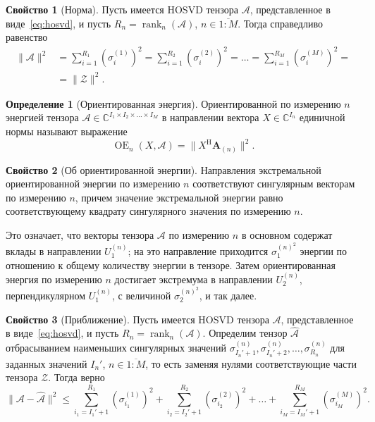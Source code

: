 \documentclass[specialist,
    substylefile = spbu_report.rtx,
    subf,href,colorlinks=true, 12pt]{disser}
\theoremstyle{plain}
\theoremstyle{definition}
\newtheorem{definition}{Определение}[section]
\newtheorem{property}{Свойство}[section]
\theoremstyle{remark}
\begin{document}
    \begin{property}[Норма]
        \label{property:norm}
        Пусть имеется HOSVD тензора $\mathcal{A}$, представленное в виде~\eqref{eq:hosvd}, и пусть $R_n=\operatorname{rank}_n(\mathcal{A})$,
        $n\in \overline{1:M}$.
        Тогда справедливо равенство
        \begin{align*}
            \|\mathcal{A}\|^2&=\sum_{i=1}^{R_1}\left( \sigma_i^{(1)} \right)^2=\sum_{i=1}^{R_2}\left( \sigma_i^{(2)} \right)^2
            =\ldots =\sum_{i=1}^{R_M}\left( \sigma_i^{(M)} \right)^2=\\
            &= \|\mathcal{Z}\|^2.
        \end{align*}
    \end{property}

    \begin{definition}[Ориентированная энергия]
        Ориентированной по измерению $n$ энергией тензора $\mathcal{A}\in \mathbb{C}^{I_1\times I_2\times \ldots \times I_M}$ в направлении
        вектора $X\in \mathbb{C}^{I_n}$ единичной нормы называют выражение
        \[
            \operatorname{OE}_n(X, \mathcal{A}) = \|X^{\mathrm{H}}\mathbf{A}_{(n)}\|^2.
        \]
    \end{definition}

    \begin{property}[Об ориентированной энергии]
        \label{property:oriented-energy}
        Направления экстремальной ориентированной энергии по измерению $n$ соответствуют сингулярным векторам по измерению $n$,
        причем значение экстремальной энергии равно соответствующему квадрату сингулярного значения по измерению $n$.
    \end{property}

    Это означает, что векторы тензора $\mathcal{A}$ по измерению $n$ в основном содержат вклады в направлении $U^{(n)}_1$;
    на это направление приходится $\sigma^{(n)^2}_1$ энергии по отношению к общему количеству энергии в тензоре.
    Затем ориентированная энергия по измерению $n$ достигает экстремума в направлении $U^{(n)}_2$,
    перпендикулярном $U^{(n)}_1$, с величиной $\sigma^{(n)^2}_2$, и так далее.

    \begin{property}[Приближение]
        \label{property:approx}
        Пусть имеется HOSVD тензора $\mathcal{A}$, представленное в виде~\eqref{eq:hosvd}, и пусть $R_n=\operatorname{rank}_n(\mathcal{A})$.
        Определим тензор $\hat{\mathcal{A}}$ отбрасыванием наименьших сингулярных значений $\sigma_{I_{n}'+1}^{(n)}, \sigma_{I_{n}'+2}^{(n)},\ldots, \sigma_{R_n}^{(n)}$
        для заданных значений $I_{n}'$, $n \in \overline{1:M}$, то есть заменяя нулями соответствующие части тензора $\mathcal{Z}$.
        Тогда верно
        \begin{equation}
            \|\mathcal{A}-\hat{\mathcal{A}}\|^2\leqslant \sum_{i_1=I_{1}'+1}^{R_1}\left( \sigma_{i_1}^{(1)}\right)^2 +
            \sum_{i_2=I_{2}'+1}^{R_2}\left( \sigma_{i_2}^{(2)}\right)^2 + \ldots + \sum_{i_M=I_{M}'+1}^{R_M}\left( \sigma_{i_M}^{(M)}\right)^2.\label{eq:approx}
        \end{equation}
    \end{property}
\end{document}
